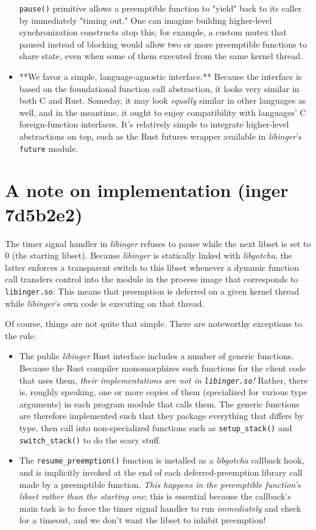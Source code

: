 \documentclass[12pt,letterpaper]{book}
\begin{document}
\begin{itemize}
	\texttt{pause()} primitive allows a preemptible function to "yield" back to its caller by immediately
	"timing out."  One can imagine building higher-level synchronization constructs atop this; for
	example, a custom mutex that paused instead of blocking would allow two or more preemptible
	functions to share state, even when some of them executed from the same kernel thread.
\item **We favor a simple, language-agnostic interface.**  Because the interface is based on the
	foundational function call abstraction, it looks very similar in both C and Rust.  Someday, it
	may look \textit{equally} similar in other languages as well, and in the meantime, it ought to enjoy
	compatibility with languages' C foreign-function interfaces.  It's relatively simple to integrate
	higher-level abstractions on top, such as the Rust futures wrapper available in \textit{libinger}'s
	\texttt{future} module.
\end{itemize}


\section{A note on implementation (inger 7d5b2e2)}

The timer signal handler in \textit{libinger} refuses to pause while the next libset is set to 0 (the
starting libset).  Because \textit{libinger} is statically linked with \textit{libgotcha}, the latter enforces a
transparent switch to this libset whenever a dynamic function call transfers control into the module
in the process image that corresponds to \texttt{libinger.so}.  This means that preemption is deferred on a
given kernel thread while \textit{libinger}'s own code is executing on that thread.

Of course, things are not quite that simple.  There are noteworthy exceptions to the rule:
\begin{itemize}
\item The public \textit{libinger} Rust interface includes a number of generic functions.  Because the Rust
	compiler monomorphizes such functions for the client code that uses them, \textit{their implementations
	are \textrm{not} in \texttt{libinger.so}!}  Rather, there is, roughly speaking, one or more copies of them
	(specialized for various type arguments) in each program module that calls them.  The generic
	functions are therefore implemented such that they package everything that differs by type, then
	call into non-specialized functions such as \texttt{setup\_stack()} and \texttt{switch\_stack()} to do the scary
	stuff.
\item The \texttt{resume\_preemption()} function is installed as a \textit{libgotcha} callback hook, and is implicitly
	invoked at the end of each deferred-preemption library call made by a preemptible function.
	\textit{This happens in the preemptible function's libset rather than the starting one}; this is
	essential because the callback's main task is to force the timer signal handler to run
	\textit{immediately} and check for a timeout, and we don't want the libset to inhibit preemption!
\end{itemize}
\end{document}
